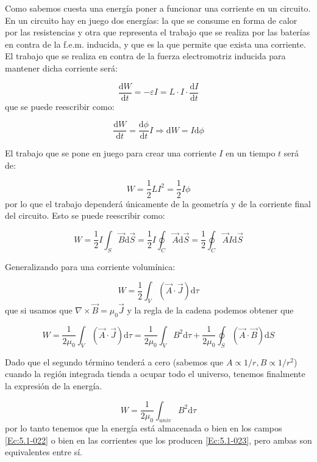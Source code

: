 \documentclass[12pt]{article}
\newcommand{\D}{\mathrm{d}}
\begin{document}
Como sabemos cuesta una energía poner a funcionar una corriente en un circuito. En un circuito hay en juego dos energías: la que se consume en forma de calor por las resistencias y otra que representa el trabajo que se realiza por las baterías en contra de la f.e.m. inducida, y que es la que permite que exista una corriente. El trabajo que se realiza en contra de la fuerza electromotriz inducida para mantener dicha corriente será:

\begin{equation}
\dfrac{\D W}{\D t} = - \varepsilon I = L \cdot I \cdot \dfrac{\D I}{\D t}
\end{equation}
que se puede reescribir como:

\begin{equation}
\dfrac{\D W}{\D t} =  \dfrac{\D \phi}{\D t} I \Longrightarrow \D W = I \D \phi
\end{equation}

El trabajo que se pone en juego para crear una corriente $I$ en un tiempo $t$ será de:

\begin{equation}
W = \dfrac{1}{2} L I^2 = \dfrac{1}{2} I \phi
\end{equation}
por lo que el trabajo dependerá únicamente de la geometría y de la corriente final del circuito. Esto se puede reescribir como:

$$ W = \dfrac{1}{2} I \int_S \vec{B} \D \vec{S} = \dfrac{1}{2} I \oint_C \vec{A} \D \vec{S}
=  \dfrac{1}{2} \oint_C \vec{A} I \D \vec{S} $$ 


Generalizando para una corriente volumínica:

\begin{equation}
W = \dfrac{1}{2} \int_V (\vec{A} \cdot \vec{J}) \D \tau \label{Ec:5.1-022}
\end{equation}
que si usamos que $\nabla \times \vec{B} = \mu_0 \vec{J}$ y la regla de la cadena podemos obtener que

$$ W = \dfrac{1}{2 \mu_0} \int_V (\vec{A} \cdot \vec{J})  \D \tau = \dfrac{1}{2 \mu_0} \int_V B^2 \D \tau + \dfrac{1}{2 \mu_0} \oint_S(\vec{A} \cdot \vec{B})   \D S $$

Dado que el segundo término tenderá a cero (sabemos que $A \propto 1/r, B \propto 1/r^2$) cuando la región integrada tienda a ocupar todo el universo, tenemos finalmente la expresión de la energía. 

\begin{equation}
W = \dfrac{1}{2 \mu_0} \int_{univ} B^2 \D \tau \label{Ec:5.1-023}
\end{equation}
por lo tanto tenemos que la energía está almacenada o bien en los campos \ref{Ec:5.1-022} o bien en las corrientes que los producen \ref{Ec:5.1-023}, pero ambas son equivalentes entre sí. \\
\end{document}
